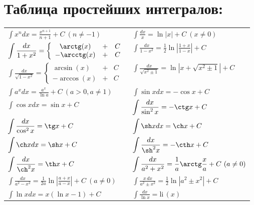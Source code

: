 \documentclass[12pt, a6paper]{extarticle}
\begin{document}
\section{Таблица простейших интегралов:}
\begin{tabular}{ll}
$\displaystyle \int{x^ndx} = \frac{x^{n+1}}{n+1} + C \ (n\neq-1) $ &
$\displaystyle \int{\frac{dx}{x}}=\ln |x| + C \ (x\neq0)         $ \\
$\displaystyle \int{\frac{dx}{1+x^2}} = \left\{\begin{array}{ccc} \arctg (x) & + & C \\-\arcctg(x) & + & C
\end{array}\right. $ & 
$\displaystyle \int{\frac{dx}{1-x^2}} = \frac{1}{2} \ln \left| \frac{1+x}{1-x} \right| + C $ \\
$\displaystyle \int{\frac{dx}{\sqrt{1-x^2}}} = \left\{ \begin{array}{ccc} \arcsin (x) & + & C \\ -\arccos(x) & + & C \end{array}\right. $ &
$\displaystyle \int{\frac{dx}{\sqrt{x^2\pm1}}} = \ln \left|x+\sqrt{x^2\pm1} \right| + C$ \\
$\displaystyle \int{a^x dx} = \frac{a^x}{\ln a} + C \ (a>0,a\neq1)$ &
$\displaystyle \int{\sin x dx} = -\cos x + C $ \\
$\displaystyle \int{\cos x dx} = \sin x + C $ &
$\displaystyle \int{\frac{dx}{\sin^2x}} = -\ctg x + C $ \\
$\displaystyle \int{\frac{dx}{\cos^2x}} = \tg x + C $ &  
$\displaystyle \int{\sh x dx} = \ch x + C $ \\
$\displaystyle \int{\ch x dx} = \sh x + C $ &
$\displaystyle \int{\frac{dx}{\sh^2x}} = -\cth x + C $ \\
$\displaystyle \int{\frac{dx}{\ch^2x}} = \th x + C $ & 
$\displaystyle \int{\frac{dx}{a^2+x^2}} = \frac{1}{a}  \arctg \frac{x}{a} + C \ (a\neq0) $ \\
$\displaystyle \int{\frac{dx}{a^2-x^2}} = \frac{1}{2a} \ln \left|\frac{a+x}{a-x}\right| + C \ (a\neq0) $ &
$\displaystyle \int{\frac{x\,dx}{a^2\pm x^2}} = \frac{1}{2} \ln \left|a^2\pm x^2\right| + C $ \\
$\displaystyle \int{\ln x dx} = x(\ln x - 1) + C$ &
$\displaystyle \int{\frac{dx}{\ln x}} = \text{li}\,(x)$ \\
\end{tabular} 
\par \- \newline
\par \- \newline
\end{document}
